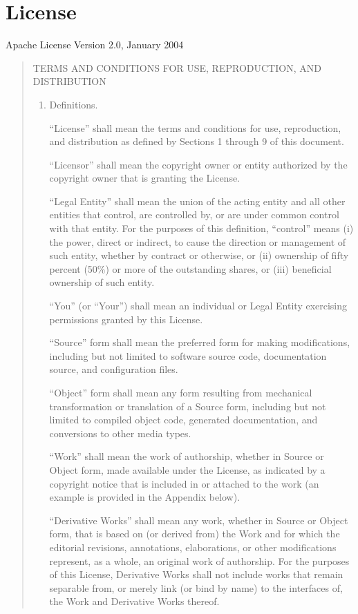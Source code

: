 \documentclass[letterpaper,10pt,english]{sphinxmanual}
\begin{document}
\chapter{License}
\label{\detokenize{license:license}}\label{\detokenize{license::doc}}
Apache License
Version 2.0, January 2004
\begin{quote}

TERMS AND CONDITIONS FOR USE, REPRODUCTION, AND DISTRIBUTION
\begin{enumerate}
%
\item {} 
Definitions.

“License” shall mean the terms and conditions for use, reproduction,
and distribution as defined by Sections 1 through 9 of this document.

“Licensor” shall mean the copyright owner or entity authorized by
the copyright owner that is granting the License.

“Legal Entity” shall mean the union of the acting entity and all
other entities that control, are controlled by, or are under common
control with that entity. For the purposes of this definition,
“control” means (i) the power, direct or indirect, to cause the
direction or management of such entity, whether by contract or
otherwise, or (ii) ownership of fifty percent (50\%) or more of the
outstanding shares, or (iii) beneficial ownership of such entity.

“You” (or “Your”) shall mean an individual or Legal Entity
exercising permissions granted by this License.

“Source” form shall mean the preferred form for making modifications,
including but not limited to software source code, documentation
source, and configuration files.

“Object” form shall mean any form resulting from mechanical
transformation or translation of a Source form, including but
not limited to compiled object code, generated documentation,
and conversions to other media types.

“Work” shall mean the work of authorship, whether in Source or
Object form, made available under the License, as indicated by a
copyright notice that is included in or attached to the work
(an example is provided in the Appendix below).

“Derivative Works” shall mean any work, whether in Source or Object
form, that is based on (or derived from) the Work and for which the
editorial revisions, annotations, elaborations, or other modifications
represent, as a whole, an original work of authorship. For the purposes
of this License, Derivative Works shall not include works that remain
separable from, or merely link (or bind by name) to the interfaces of,
the Work and Derivative Works thereof.


\end{enumerate}
\end{quote}
\end{document}
